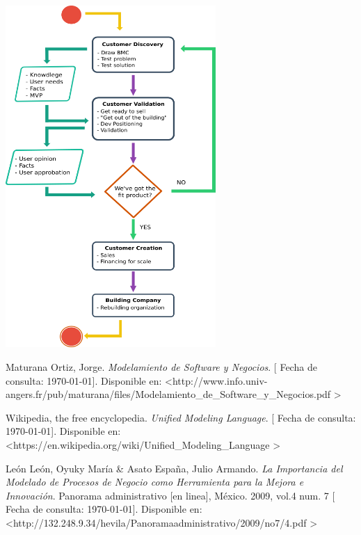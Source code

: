 \documentclass[spanish,12pt,letterpapper]{article}
\begin{document}
	\begin{center}
	\includegraphics[width=0.6\textwidth]{./diagram}~\\[0.5cm]
	\end{center}
	
	
	\pagebreak
	\begin{thebibliography}{9}
		 Maturana Ortiz, Jorge. 
		\emph{Modelamiento de Software y Negocios}. {[} Fecha de consulta: \today {]}. Disponible en: \textless http://www.info.univ-angers.fr/pub/maturana/files/Modelamiento\_de\_Software\_y\_Negocios.pdf \textgreater
		
		 Wikipedia, the free encyclopedia. 
		\emph{Unified Modeling Language}. {[} Fecha de consulta: \today {]}. Disponible en: \textless https://en.wikipedia.org/wiki/Unified\_Modeling\_Language \textgreater
		
		 León León, Oyuky María \& Asato España, Julio Armando. 
		\emph{La Importancia del Modelado de Procesos de
			Negocio como Herramienta para la Mejora e
			Innovación}. Panorama administrativo {[}en linea{]}, México. 2009, vol.4 num. 7  {[} Fecha de consulta: \today {]}. Disponible en: \textless http://132.248.9.34/hevila/Panoramaadministrativo/2009/no7/4.pdf \textgreater
	\end{thebibliography}
\end{document}

